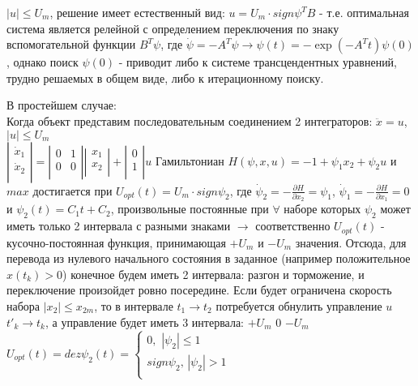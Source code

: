 \documentclass[preprint,russian,a5paper,10pt,twoside,mediummath]{ncc}
\begin{document}
$\left| u \right|\le {{U}_{m}}$, решение имеет естественный вид: $u={{U}_{m}}\cdot sign{{\psi }^{T}}B$ - т.е. оптимальная система является релейной с определением переключения по знаку вспомогательной функции ${{B}^{T}}\psi $, где $\dot{\psi }=-{{A}^{T}}\psi \to \psi \left( t \right)=-\exp \left( -{{A}^{T}}t \right)\psi \left( 0 \right)$, однако поиск $\psi \left( 0 \right)$ - приводит либо к системе трансцендентных уравнений, трудно решаемых в общем виде, либо к итерационному поиску.
\par В простейшем случае:
\\Когда объект представим последовательным соединением 2 интеграторов: $\ddot{x}=u$, $\left| u \right|\le {{U}_{m}}$
\\$\left| \begin{array}{*{35}{l}}
   {{{\dot{x}}}_{1}}  \\
   {{{\dot{x}}}_{2}}  \\
\end{array} \right|=\left| \begin{matrix}
   0 & 1  \\
   0 & 0  \\
\end{matrix} \right|\left| \begin{matrix}
   {{x}_{1}}  \\
   {{x}_{2}}  \\
\end{matrix} \right|+\left| \begin{matrix}
   0  \\
   1  \\
\end{matrix} \right|u$
Гамильтониан $H\left( \psi ,x,u \right)=-1+{{\psi }_{1}}{{x}_{2}}+{{\psi }_{2}}u$ и $max$ достигается при ${{U}_{opt}}\left( t \right)={{U}_{m}}\cdot sign{{\psi }_{2}}$, где 
${{\dot{\psi }}_{2}}=-\frac{\partial H}{\partial {{x}_{2}}}={{\psi }_{1}}$, ${{\dot{\psi }}_{1}}=-\frac{\partial H}{\partial {{x}_{1}}}=0$ и ${{\psi }_{2}}\left( t \right)={{C}_{1}}t+{{C}_{2}}$, произвольные постоянные при $\forall $ наборе которых ${{\psi }_{2}}$ может иметь только 2 интервала с разными знаками $\to $ соответственно ${{U}_{opt}}\left( t \right)$ - кусочно-постоянная функция, принимающая $+{{U}_{m}}$ и $-{{U}_{m}}$ значения. Отсюда, для перевода из нулевого начального состояния в заданное (например положительное $x\left( {{t}_{k}} \right)>0$) конечное будем иметь 2 интервала: разгон и торможение, и переключение произойдет ровно посередине. Если будет ограничена скорость набора $\left| {{x}_{2}} \right|\le {{x}_{2m}}$, то в интервале ${{t}_{1}}\to {{t}_{2}}$ потребуется обнулить управление $u$ ${{{t}'}_{k}}\to {{t}_{k}}$, а управление будет иметь 3 интервала: $+{{U}_{m}}$ $0$ $-{{U}_{m}}$ ${{U}_{opt}}\left( t \right)=dez{{\psi }_{2}}\left( t \right)=\left\{ \begin{array}{*{35}{l}}
   0,\,\,\left| {{\psi }_{2}} \right|\le 1  \\
   sign{{\psi }_{2}},\,\left| {{\psi }_{2}} \right|>1  \\
\end{array} \right.$
\end{document}

